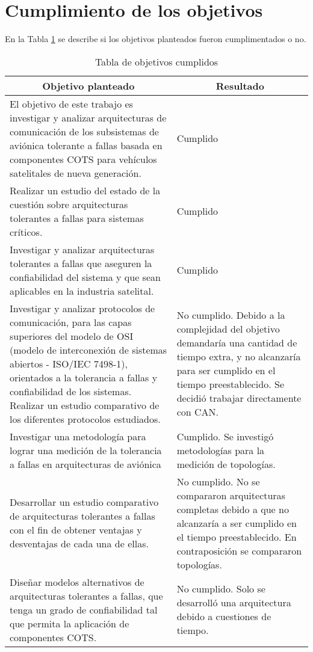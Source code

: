 \section{Cumplimiento de los objetivos}
En la Tabla \ref{table:objetivos_cumplidos} se describe
si los objetivos planteados fueron cumplimentados o no.
\begin{table}[h!]
\small
\centering
\caption{Tabla de objetivos cumplidos}
\label{table:objetivos_cumplidos}
\begin{tabular}{|p{7cm}|p{8cm}|}
\hline
\multicolumn{1}{|c|}{\textbf{Objetivo planteado}} & \multicolumn{1}{c|}{\textbf{Resultado}} \\ \hline
El objetivo de este trabajo es investigar y analizar arquitecturas de comunicación de los subsistemas de
aviónica tolerante a fallas basada en componentes COTS para vehículos satelitales de nueva generación. & Cumplido \\ \hline
Realizar un estudio del estado de la cuestión sobre arquitecturas tolerantes a fallas para sistemas críticos. & Cumplido \\ \hline
Investigar y analizar arquitecturas tolerantes a fallas que aseguren la confiabilidad del sistema y que sean
aplicables en la industria satelital. & Cumplido \\ \hline
Investigar y analizar protocolos de comunicación, para las capas superiores del modelo de OSI (modelo
de interconexión de sistemas abiertos - ISO/IEC 7498-1), orientados a la tolerancia a fallas y confiabilidad
de los sistemas. Realizar un estudio comparativo de los diferentes protocolos estudiados. & No cumplido. Debido a la complejidad
del objetivo demandaría una cantidad de tiempo extra, y no alcanzaría para ser cumplido en el tiempo preestablecido. Se decidió
trabajar directamente con CAN. \\ \hline
Investigar una metodología para lograr una medición de la tolerancia a fallas en arquitecturas de aviónica & Cumplido. Se investigó
metodologías para la medición de topologías. \\ \hline
Desarrollar un estudio comparativo de arquitecturas tolerantes a fallas con el fin de obtener ventajas y
desventajas de cada una de ellas. & No cumplido. No se compararon arquitecturas completas debido a que no alcanzaría a ser
cumplido en el tiempo preestablecido. En contraposición se compararon topologías. \\ \hline
Diseñar modelos alternativos de arquitecturas tolerantes a fallas, que tenga un grado de confiabilidad tal
que permita la aplicación de componentes COTS. & No cumplido. Solo se desarrolló una arquitectura debido a cuestiones de tiempo. \\ \hline

\end{tabular}
\end{table}
